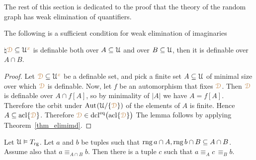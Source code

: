 The rest of this section is dedicated to the proof that the theory of the random graph has weak elimination of quantifiers.

\begin{lemma}\label{lem_suff_wei}
  The following is a sufficient condition for weak elimination of imaginaries

  $\natural$\qquad ${\color{brown}\EuScript D}\subseteq\EuScript U^{\color{brown} x}$ is definable both over $A\subseteq\EuScript U$ and over $B\subseteq\EuScript U$, then it is definable over $A\cap B$.
\end{lemma}

\begin{proof}
  Let ${\color{brown}\EuScript D}\subseteq\EuScript U^{\color{brown} x}$ be a definable set, and pick a finite set $A\subseteq\EuScript U$ of minimal size over which ${\color{brown}\EuScript D}$ is definable. 
  Now, let $f$ be an automorphism that fixes ${\color{brown}\EuScript D}$. Then ${\color{brown}\EuScript D}$ is definable over $A\cap f[A]$, so by minimality of $|A|$ we have $A= f[A]$. 
  Therefore the orbit under ${\rm Aut\kern.15ex}(\EuScript U/\{{\color{brown}\EuScript D}\})$ of the elements of $A$ is finite.
  Hence $A\subseteq{\rm acl}\{{\color{brown}\EuScript D}\}$.
  Therefore ${\color{brown}\EuScript D}\in{\rm dcl}^{{\rm eq}}\big({\rm acl}\{{\color{brown}\EuScript D}\}\big)$
  The lemma follows by applying Theorem~\ref{thm_elimimd}.
\end{proof}

\begin{lemma}\label{lem_type_amalgamation}
  Let $\EuScript U\vDash T_{\rm rg}$.
  Let $a$ and $b$ be tuples such that $\mathop{\rm rng} a\cap A,\mathop{\rm rng} b\cap B\subseteq A\cap B$.
  Assume also that $a\equiv_{A\cap B}b$.
  Then there is a tuple $c$ such that $a\equiv_A c\,\equiv_B b$.
\end{lemma}

